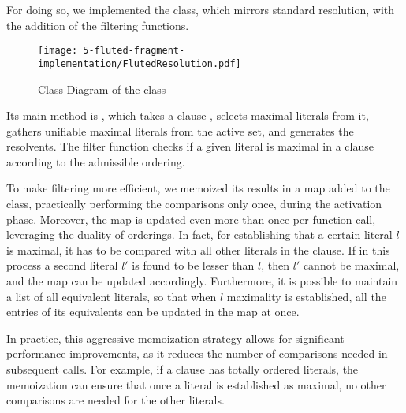 For doing so, we implemented the  class, which mirrors standard resolution, with the addition of the filtering functions.

\begin{figure}[H]
  \centering
  \texttt{[image: 5-fluted-fragment-implementation/FlutedResolution.pdf]}
  \caption{Class Diagram of the  class}
\end{figure}

Its main method is , which takes a clause , selects maximal literals from it, gathers unifiable maximal literals from the active set, and generates the resolvents.
The filter function  checks if a given literal is maximal in a clause according to the admissible ordering.

To make filtering more efficient, we memoized its results in a map  added to the  class, practically performing the comparisons only once, during the activation phase.
Moreover, the map is updated even more than once per function call, leveraging the duality of orderings.
In fact, for establishing that a certain literal \(l\) is maximal, it has to be compared with all other literals in the clause.
If in this process a second literal \(l'\) is found to be lesser than \(l\), then \(l'\) cannot be maximal, and the map can be updated accordingly.
Furthermore, it is possible to maintain a list of all equivalent literals, so that when \(l\) maximality is established, all the entries of its equivalents can be updated in the map at once.

In practice, this aggressive memoization strategy allows for significant performance improvements, as it reduces the number of comparisons needed in subsequent calls.
For example, if a clause has totally ordered literals, the memoization can ensure that once a literal is established as maximal, no other comparisons are needed for the other literals.

